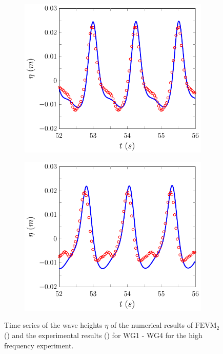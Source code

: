 \begin{figure}
\begin{subfigure}{0.5\textwidth}
		\vspace{0.5cm}
	\end{subfigure}
	\begin{subfigure}{0.5\textwidth}
		\includegraphics[width=\textwidth]{./chp6/figures/Experiment/Beji/sh/FEVMWG3.pdf}
		\vspace{0.5cm}
	\end{subfigure}%
	\begin{subfigure}{0.5\textwidth}
		\includegraphics[width=\textwidth]{./chp6/figures/Experiment/Beji/sh/FEVMWG4.pdf}
		\vspace{0.5cm}
	\end{subfigure}
	\caption{Time series of the wave heights $\eta$ of the numerical results of $\text{FEVM}_2$ ({\color{blue}\solidrule}) and the experimental results () for WG1 - WG4 for the high frequency experiment.}
	\label{fig:BejishWG1to4FEVM}
\end{figure}
